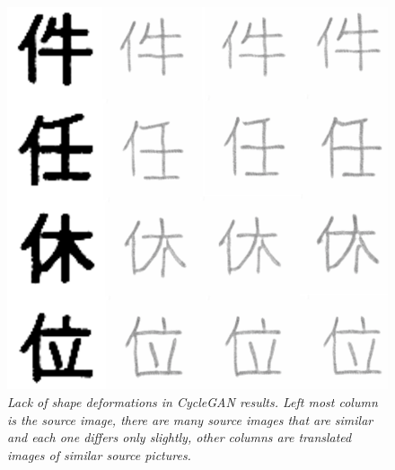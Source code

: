 \documentclass[12pt]{report}
\begin{document}
\begin{figure}[H]
	\centering
	\includegraphics[scale=0.7]{cycle-gan-result-2}
	\caption{\textit{Lack of shape deformations in CycleGAN results. Left most column is the source image, there are many source images that are similar and each one differs only slightly, other columns are translated images of similar source pictures.}}
	\label{fig:cycle-gan-result-2}
\end{figure}
\end{document}
